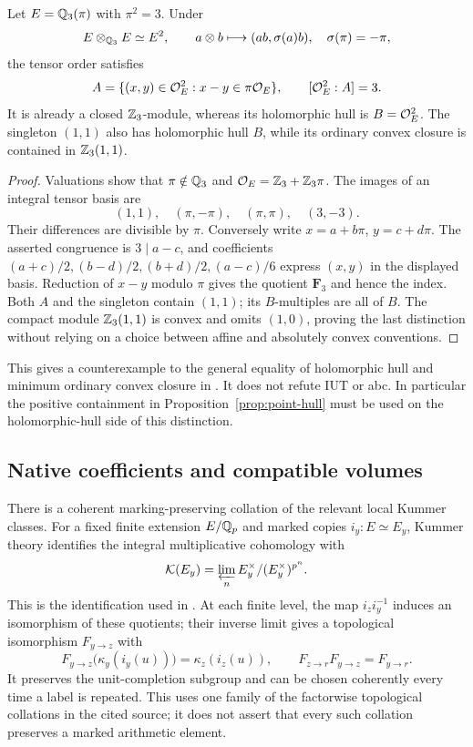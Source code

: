 \begin{proposition}\label{prop:hull-convex-difference}
Let $E=\mathbb Q_3(\pi)$ with $\pi^2=3$. Under
\[
 E\otimes_{\mathbb Q_3}E\simeq E^2,\qquad
 a\otimes b\longmapsto(ab,\sigma(a)b),\quad\sigma(\pi)=-\pi,
\]
the tensor order satisfies
\[
 A=\{(x,y)\in\mathcal O_E^2:x-y\in\pi\mathcal O_E\},\qquad [\mathcal O_E^2:A]=3.
\]
It is already a closed $\mathbb Z_3$-module, whereas its holomorphic hull is
$B=\mathcal O_E^2$. The singleton $(1,1)$ also has holomorphic hull $B$,
while its ordinary convex closure is contained in $\mathbb Z_3(1,1)$.
\end{proposition}
\begin{proof}
Valuations show that $\pi\notin\mathbb Q_3$ and
$\mathcal O_E=\mathbb Z_3+\mathbb Z_3\pi$. The images of an integral tensor basis are
\[
 (1,1),\quad(\pi,-\pi),\quad(\pi,\pi),\quad(3,-3).
\]
Their differences are divisible by $\pi$. Conversely write
$x=a+b\pi$, $y=c+d\pi$. The asserted congruence is $3\mid a-c$,
and coefficients $(a+c)/2,(b-d)/2,(b+d)/2,(a-c)/6$ express $(x,y)$
in the displayed basis. Reduction of $x-y$ modulo $\pi$ gives the
quotient $\mathbf F_3$ and hence the index. Both $A$ and the singleton
contain $(1,1)$; its $B$-multiples are all of $B$.
The compact module $\mathbb Z_3(1,1)$ is convex and omits $(1,0)$, proving
the last distinction without relying on a choice between affine and
absolutely convex conventions.
\end{proof}

This gives a counterexample to the general equality of holomorphic hull
and minimum ordinary convex closure in
\cite[Proposition~9.10.8.1]{JoshiIII}. It does not refute IUT or abc.
In particular the positive containment in Proposition~\ref{prop:point-hull}
must be used on the holomorphic-hull side of this distinction.

\subsection{Native coefficients and compatible volumes}
There is a coherent marking-preserving collation of the relevant local
Kummer classes. For a fixed finite extension $E/\mathbb Q_p$ and marked copies
$i_y:E\simeq E_y$, Kummer theory identifies the integral multiplicative
cohomology with
\[
 \mathcal K(E_y)=\varprojlim_n E_y^\times/(E_y^\times)^{p^n}.
\]
This is the identification used in
\cite[Proposition~7.2.2]{JoshiIIhalf}. At each finite level, the map
$i_z i_y^{-1}$ induces an isomorphism of these quotients; their inverse
limit gives a topological isomorphism $F_{y\to z}$ with
\[
 F_{y\to z}\bigl(\kappa_y(i_y(u))\bigr)=\kappa_z(i_z(u)),\qquad
 F_{z\to r}F_{y\to z}=F_{y\to r}.
\]
It preserves the unit-completion subgroup and can be chosen coherently
every time a label is repeated. This uses one family of the factorwise
topological collations in the cited source; it does not assert that every
such collation preserves a marked arithmetic element.

